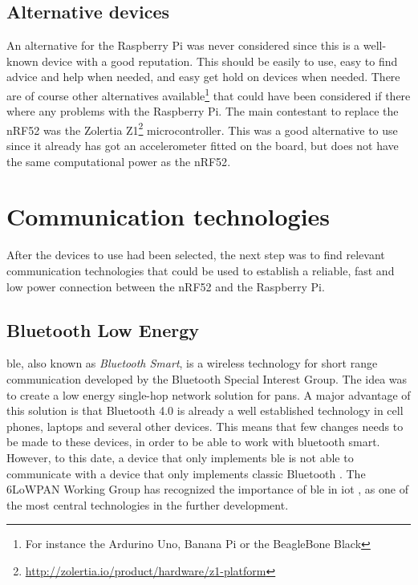 \subsection{Alternative devices}

An alternative for the Raspberry Pi was never considered since this is a well-known device with a good reputation. This should be easily to use, easy to find advice and help when needed, and easy get hold on devices when needed. There are of course other alternatives available\footnote{For instance the Ardurino Uno, Banana Pi or the BeagleBone Black} that could have been considered if there where any problems with the Raspberry Pi. The main contestant to replace the nRF52 was the Zolertia Z1\footnote{\url{http://zolertia.io/product/hardware/z1-platform}} microcontroller. This was a good alternative to use since it already has got an accelerometer fitted on the board, but does not have the same computational power as the \gls{nRF52}. 



\section{Communication technologies}

\noindent After the devices to use had been selected, the next step was to find relevant communication technologies that could be used to establish a reliable, fast and low power connection between the \gls{nRF52} and the \gls{Raspberry Pi}. 

\subsection{Bluetooth Low Energy}

\noindent \gls{ble}, also known as \textit{Bluetooth Smart}, is a wireless technology for short range communication developed by the Bluetooth Special Interest Group. The idea was to create a low energy single-hop network solution for \glspl{pan}. A major advantage of this solution is that Bluetooth 4.0 is already a well established technology in cell phones, laptops and several other devices. This means that few changes needs to be made to these devices, in order to be able to work with bluetooth smart. However, to this date, a device that only implements \gls{ble} is not able to communicate with a device that only implements classic Bluetooth \cite{gomez2012overview}.
The 6LoWPAN Working Group has recognized the importance of \gls{ble} in \gls{iot} \cite{hui2008extending}, as one of the most central technologies in the further development. %

